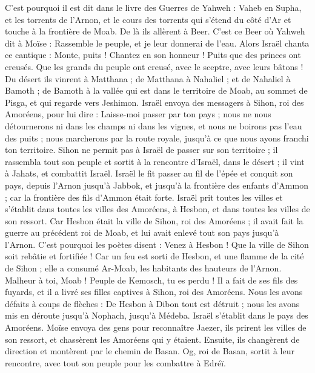 \begin{multicols}{2}
C'est pourquoi il est dit dans le livre des Guerres de Yahweh : Vaheb en Supha, et les torrents de l’Arnon,
et le cours des torrents qui s’étend du côté d’Ar et touche à la frontière de Moab.
De là ils allèrent à Beer. C'est ce Beer où Yahweh dit à Moïse : Rassemble le peuple, et je leur donnerai de l'eau.
Alors Israël chanta ce cantique : Monte, puits ! Chantez en son honneur !
Puits que des princes ont creusés. Que les grands du peuple ont creusé, avec le sceptre, avec leurs bâtons ! Du désert ils vinrent à Matthana ;
de Matthana à Nahaliel ; et de Nahaliel à Bamoth ;
de Bamoth à la vallée qui est dans le territoire de Moab, au sommet de Pisga, et qui regarde vers Jeshimon.
Israël envoya des messagers à Sihon, roi des Amoréens, pour lui dire :
Laisse-moi passer par ton pays ; nous ne nous détournerons ni dans les champs ni dans les vignes, et nous ne boirons pas l’eau des puits ; nous marcherons par la route royale, jusqu'à ce que nous ayons franchi ton territoire.
Sihon ne permit pas à Israël de passer sur son territoire ; il rassembla tout son peuple et sortit à la rencontre d’Israël, dans le désert ; il vint à Jahats, et combattit Israël.
Israël le fit passer au fil de l'épée et conquit son pays, depuis l’Arnon jusqu'à Jabbok, et jusqu'à la frontière des enfants d’Ammon ; car la frontière des fils d’Ammon était forte.
Israël prit toutes les villes et s’établit dans toutes les villes des Amoréens, à Hesbon, et dans toutes les villes de son ressort.
Car Hesbon était la ville de Sihon, roi des Amoréens ; il avait fait la guerre au précédent roi de Moab, et lui avait enlevé tout son pays jusqu'à l’Arnon.
C'est pourquoi les poètes disent : Venez à Hesbon ! Que la ville de Sihon soit rebâtie et fortifiée !
Car un feu est sorti de Hesbon, et une flamme de la cité de Sihon ; elle a consumé Ar-Moab, les habitants des hauteurs de l’Arnon.
Malheur à toi, Moab ! Peuple de Kemosch, tu es perdu ! Il a fait de ses fils des fuyards, et il a livré ses filles captives à Sihon, roi des Amoréens.
Nous les avons défaits à coups de flèches : De Hesbon à Dibon tout est détruit ; nous les avons mis en déroute jusqu'à Nophach, jusqu'à Médeba.
Israël s’établit dans le pays des Amoréens.
Moïse envoya des gens pour reconnaître Jaezer, ils prirent les villes de son ressort, et chassèrent les Amoréens qui y étaient.
Ensuite, ils changèrent de direction et montèrent par le chemin de Basan. Og, roi de Basan, sortit à leur rencontre, avec tout son peuple pour les combattre à Edréï.

\end{multicols}
